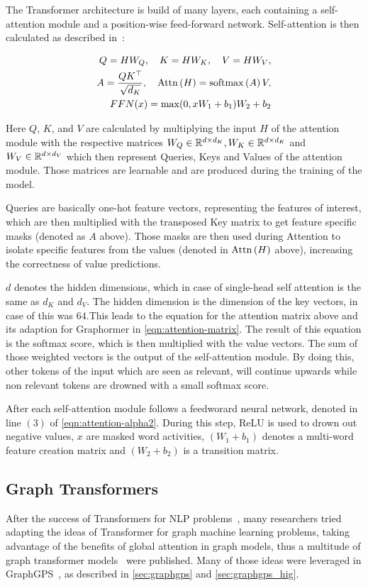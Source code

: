 The Transformer architecture is build of many layers, each containing a self-attention module and a position-wise feed-forward network. Self-attention is then calculated as described in~\cite{2021graphormer}:

\begin{align}
    Q = HW_Q,\quad K = HW_K,\quad V = HW_V,\label{eqn:attention-alpha} \\
    A = \frac{QK^\top}{\sqrt{d_K}}, \quad \mathrm{Attn}\left(H\right) = \mathrm{softmax}\left(A\right)V, \\
    FFN(x) = \max(0,xW_1 + b_1)W_2 + b_2
    \label{eqn:attention-alpha2}
\end{align}

Here $Q$, $K$, and $V$ are calculated by multiplying the input $H$ of the attention module with the respective matrices $W_Q\in\mathbb{R}^{d\times d_K}, W_K\in\mathbb{R}^{d\times d_K}$ and $ W_V\in\mathbb{R}^{d\times d_V}$ which then represent Queries, Keys and Values of the attention module. Those matrices are learnable and are produced during the training of the model.

Queries are basically one-hot feature vectors, representing the features of interest, which are then multiplied with the transposed Key matrix to get feature specific masks (denoted as $A$ above). Those masks are then used during Attention to isolate specific features from the values (denoted in $\mathrm{Attn}\left(H\right)$ above), increasing the correctness of value predictions.

$d$ denotes the hidden dimensions, which in case of single-head self attention is the same as $d_K$ and $d_V$. The hidden dimension is the dimension of the key vectors, in case of \cite{vaswani2017attention} this was $64$.This leads to the equation for the attention matrix above and its adaption for Graphormer in \autoref{eqn:attention-matrix}. The result of this equation is the softmax score, which is then multiplied with the value vectors. The sum of those weighted vectors is the output of the self-attention module. By doing this, other tokens of the input which are seen as relevant, will continue upwards while non relevant tokens are drowned with a small softmax score.

After each self-attention module follows a feedworard neural network, denoted in line $(3)$ of \autoref{eqn:attention-alpha2}. During this step, ReLU is used to drown out negative values, $x$ are masked word activities, $(W_1 + b_1)$ denotes a multi-word feature creation matrix and $(W_2 + b_2)$ is a transition matrix.

\subsection{Graph Transformers}
After the success of Transformers for NLP problems~\cite{kalyan2021ammus}, many researchers tried adapting the ideas of Transformer for graph machine learning problems, taking advantage of the benefits of global attention in graph models, thus a multitude of graph transformer models~\cite{dwivedi2021generalizationTransformer,2021graphormer,kreuzer2021rethinking,mialon2021graphit,wu2022representing} were published. Many of those ideas were leveraged in GraphGPS~\cite{2023graphgps}, as described in \ref{sec:graphgps} and \ref{sec:graphgps_hig}.

